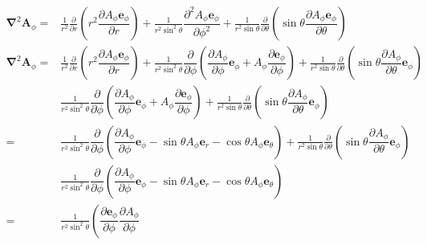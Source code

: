 \begin{align*}
    \boldsymbol{\nabla}^2\boldsymbol{A}_\phi=&\frac{1}{r^2}\frac{\partial}{\partial r}\left(r^2\dfrac{{\partial A_\phi\boldsymbol{e}_\phi}}{\partial r}\right)
+\frac{1}{r^2\sin^2\theta}\dfrac{{\partial^2 A_\phi\boldsymbol{e}_\phi}}{\partial \phi^2}
+\frac{1}{r^2\sin\theta}\frac{\partial}{\partial \theta}\left(\sin\theta\dfrac{{\partial A_\phi\boldsymbol{e}_\phi}}{\partial \theta}\right)\\
\boldsymbol{\nabla}^2\boldsymbol{A}_\phi=&\frac{1}{r^2}\frac{\partial}{\partial r}\left(r^2\dfrac{{\partial A_\phi\boldsymbol{e}_\phi}}{\partial r}\right)
+\frac{1}{r^2\sin^2\theta}\dfrac{\partial}{\partial \phi}\left(\dfrac{\partial A_\phi}{\partial \phi}\boldsymbol{e}_\phi
+A_\phi\dfrac{\partial \boldsymbol{e}_\phi}{\partial \phi}\right)
+\frac{1}{r^2\sin\theta}\frac{\partial}{\partial \theta}\left(\sin\theta\dfrac{{\partial A_\phi}}{\partial \theta}\boldsymbol{e}_\phi\right)\\
&\frac{1}{r^2\sin^2\theta}\dfrac{\partial}{\partial \phi}\left(\dfrac{\partial A_\phi}{\partial \phi}\boldsymbol{e}_\phi
+A_\phi\dfrac{\partial \boldsymbol{e}_\phi}{\partial \phi}\right)
+\frac{1}{r^2\sin\theta}\frac{\partial}{\partial \theta}\left(\sin\theta\dfrac{{\partial A_\phi}}{\partial \theta}\boldsymbol{e}_\phi\right)\\
=&\frac{1}{r^2\sin^2\theta}\dfrac{\partial}{\partial \phi}\left(\dfrac{\partial A_\phi}{\partial \phi}\boldsymbol{e}_\phi
-\sin\theta A_\phi\boldsymbol{e}_r
-\cos\theta A_\phi\boldsymbol{e}_\theta\right)
+\frac{1}{r^2\sin\theta}\frac{\partial}{\partial \theta}\left(\sin\theta\dfrac{{\partial A_\phi}}{\partial \theta}\boldsymbol{e}_\phi\right)\\
&\frac{1}{r^2\sin^2\theta}\dfrac{\partial}{\partial \phi}\left(\dfrac{\partial A_\phi}{\partial \phi}\boldsymbol{e}_\phi
-\sin\theta A_\phi\boldsymbol{e}_r
-\cos\theta A_\phi\boldsymbol{e}_\theta\right)\\
=&\frac{1}{r^2\sin^2\theta}\left(\dfrac{\partial\boldsymbol{e}_\phi}{\partial \phi}\dfrac{\partial A_\phi}{\partial \phi}

\end{align*}
